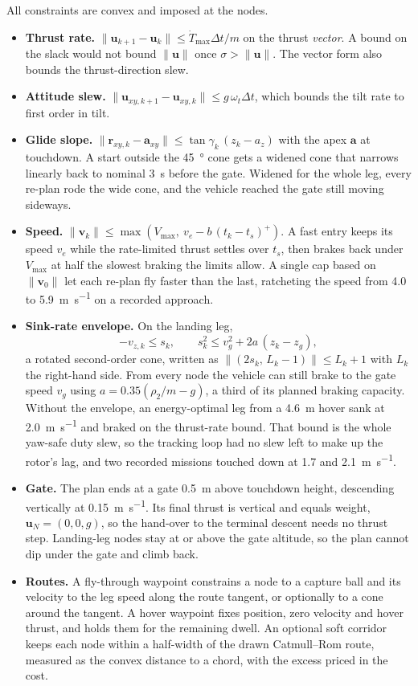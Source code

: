 \documentclass[journal]{IEEEtran}
\newcommand{\vect}[1]{\bm{#1}}
\begin{document}
All constraints are convex and imposed at the nodes.
\begin{itemize}
\item \textbf{Thrust rate.} $\|\vect{u}_{k+1} - \vect{u}_k\| \le \dot T_{\max}\Delta t/m$ on the thrust \emph{vector}.
A bound on the slack would not bound $\|\vect{u}\|$ once $\sigma > \|\vect{u}\|$.
The vector form also bounds the thrust-direction slew.
\item \textbf{Attitude slew.} $\|\vect{u}_{xy,k+1} - \vect{u}_{xy,k}\| \le g\,\omega_t\Delta t$, which bounds the tilt rate to first order in tilt.
\item \textbf{Glide slope.} $\|\vect{r}_{xy,k} - \vect{a}_{xy}\| \le \tan\gamma_k\,(z_k - a_z)$ with the apex $\vect{a}$ at touchdown.
A start outside the \SI{45}{\degree} cone gets a widened cone that narrows linearly back to nominal \SI{3}{\second} before the gate.
Widened for the whole leg, every re-plan rode the wide cone, and the vehicle reached the gate still moving sideways.
\item \textbf{Speed.} $\|\vect{v}_k\| \le \max\!\left(V_{\max},\ v_e - b\,(t_k - t_s)^+\right)$.
A fast entry keeps its speed $v_e$ while the rate-limited thrust settles over $t_s$, then brakes back under $V_{\max}$ at half the slowest braking the limits allow.
A single cap based on $\|\vect{v}_0\|$ let each re-plan fly faster than the last, ratcheting the speed from 4.0 to \SI{5.9}{\metre\per\second} on a recorded approach.
\item \textbf{Sink-rate envelope.} On the landing leg,
\begin{equation}
-v_{z,k} \le s_k, \qquad s_k^2 \le v_g^2 + 2a\,(z_k - z_g),
\label{eq:sink}
\end{equation}
a rotated second-order cone, written as $\|(2s_k,\, L_k - 1)\| \le L_k + 1$ with $L_k$ the right-hand side.
From every node the vehicle can still brake to the gate speed $v_g$ using $a = 0.35(\rho_2/m - g)$, a third of its planned braking capacity.
Without the envelope, an energy-optimal leg from a \SI{4.6}{\metre} hover sank at \SI{2.0}{\metre\per\second} and braked on the thrust-rate bound.
That bound is the whole yaw-safe duty slew, so the tracking loop had no slew left to make up the rotor's lag, and two recorded missions touched down at 1.7 and \SI{2.1}{\metre\per\second}.
\item \textbf{Gate.} The plan ends at a gate \SI{0.5}{\metre} above touchdown height, descending vertically at \SI{0.15}{\metre\per\second}.
Its final thrust is vertical and equals weight, $\vect{u}_N = (0, 0, g)$, so the hand-over to the terminal descent needs no thrust step.
Landing-leg nodes stay at or above the gate altitude, so the plan cannot dip under the gate and climb back.
\item \textbf{Routes.} A fly-through waypoint constrains a node to a capture ball and its velocity to the leg speed along the route tangent, or optionally to a cone around the tangent.
A hover waypoint fixes position, zero velocity and hover thrust, and holds them for the remaining dwell.
An optional soft corridor keeps each node within a half-width of the drawn Catmull--Rom route, measured as the convex distance to a chord, with the excess priced in the cost.
\end{itemize}
\end{document}
